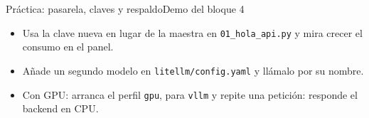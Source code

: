 \begin{frame}{Práctica: pasarela, claves y respaldo}{Demo del bloque 4}
	\begin{itemize}
		\small
		\item Usa la clave nueva en lugar de la maestra en \texttt{01\_hola\_api.py} y mira crecer el consumo en el panel.
		\item Añade un segundo modelo en \texttt{litellm/config.yaml} y llámalo por su nombre.
		\item Con GPU: arranca el perfil \texttt{gpu}, para \texttt{vllm} y repite una petición: responde el backend en CPU.
	\end{itemize}
\end{frame}
